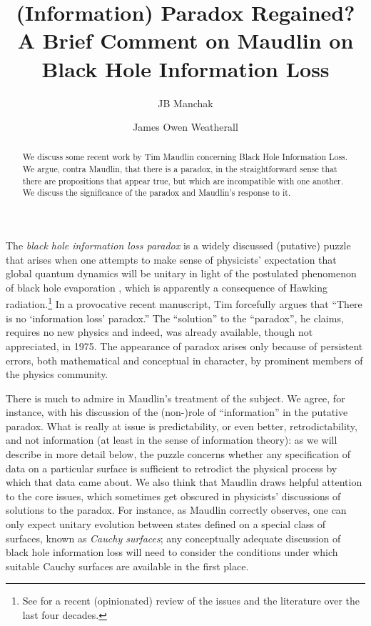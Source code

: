 \documentclass[authoryear,12pt,3p]{jowarticle}
\begin{document}
\begin{frontmatter}
\title{(Information) Paradox Regained? \\ A Brief Comment on Maudlin on Black Hole Information Loss}
\author{JB Manchak}
\author{James Owen Weatherall}
\address{Department of Logic and Philosophy of Science\\ University of California, Irvine}

\begin{abstract}
We discuss some recent work by Tim Maudlin concerning Black Hole Information Loss.  We argue, contra Maudlin, that there is a paradox, in the straightforward sense that there are propositions that appear true, but which are incompatible with one another.  We discuss the significance of the paradox and Maudlin's response to it.
\end{abstract}

\end{frontmatter}

The \emph{black hole information loss paradox} \citep{HawkingIL} is a widely discussed (putative) puzzle that arises when one attempts to make sense of physicists' expectation that global quantum dynamics will be unitary in light of the postulated phenomenon of black hole evaporation \citep{HawkingR1,HawkingR2,UnruhBHE}, which is apparently a consequence of Hawking radiation.\footnote{See \citet{Unruh+Wald} for a recent (opinionated) review of the issues and the literature over the last four decades.}  In a provocative recent manuscript, Tim \citet{Maudlin} forcefully argues that ``There is no `information loss' paradox.''  The ``solution'' to the ``paradox'', he claims, requires no new physics and indeed, was already available, though not appreciated, in 1975.  The appearance of paradox arises only because of persistent errors, both mathematical and conceptual in character, by prominent members of the physics community.

There is much to admire in Maudlin's treatment of the subject.  We agree, for instance, with his discussion of the (non-)role of ``information'' in the putative paradox.  What is really at issue is predictability, or even better, retrodictability, and not information (at least in the sense of information theory): as we will describe in more detail below, the puzzle concerns whether any specification of data on a particular surface is sufficient to retrodict the physical process by which that data came about.  We also think that Maudlin draws helpful attention to the core issues, which sometimes get obscured in physicists' discussions of solutions to the paradox. For instance, as Maudlin correctly observes, one can only expect unitary evolution between states defined on a special class of surfaces, known as \emph{Cauchy surfaces}; any conceptually adequate discussion of black hole information loss will need to consider the conditions under which suitable Cauchy surfaces are available in the first place.
\end{document}
